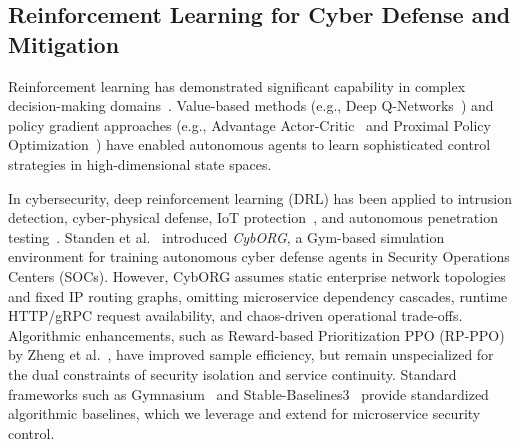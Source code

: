\documentclass[11pt,a4paper]{article}
\begin{document}
\subsection{Reinforcement Learning for Cyber Defense and Mitigation}
Reinforcement learning has demonstrated significant capability in complex decision-making domains~\cite{silver2016mastering, sutton1998reinforcement}. Value-based methods (e.g., Deep Q-Networks~\cite{mnih2015human}) and policy gradient approaches (e.g., Advantage Actor-Critic~\cite{mnih2016asynchronous} and Proximal Policy Optimization~\cite{schulman2017ppo}) have enabled autonomous agents to learn sophisticated control strategies in high-dimensional state spaces.

In cybersecurity, deep reinforcement learning (DRL) has been applied to intrusion detection, cyber-physical defense, IoT protection~\cite{xiao2018iot}, and autonomous penetration testing~\cite{nguyen2021deep, liu2025autonomous}. Standen et al.~\cite{standen2021cyborg} introduced \textit{CybORG}, a Gym-based simulation environment for training autonomous cyber defense agents in Security Operations Centers (SOCs). However, CybORG assumes static enterprise network topologies and fixed IP routing graphs, omitting microservice dependency cascades, runtime HTTP/gRPC request availability, and chaos-driven operational trade-offs. Algorithmic enhancements, such as Reward-based Prioritization PPO (RP-PPO) by Zheng et al.~\cite{zheng2025proximal}, have improved sample efficiency, but remain unspecialized for the dual constraints of security isolation and service continuity. Standard frameworks such as Gymnasium~\cite{towers2026gymnasium} and Stable-Baselines3~\cite{raffin2021stable} provide standardized algorithmic baselines, which we leverage and extend for microservice security control.
\end{document}
